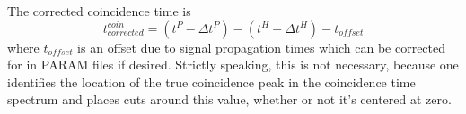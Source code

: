 The corrected coincidence time is
\begin{equation}
    t^{coin}_{corrected} = (t^P - \Delta t^P) - (t^H - \Delta t^H) - t_{offset}
\end{equation}
where $t_{offset}$ is an offset due to signal propagation times which can be
corrected for in PARAM files if desired.
Strictly speaking, this is not necessary, because one identifies the location of
the true coincidence peak in the coincidence time spectrum and places cuts
around this value, whether or not it's centered at zero.

